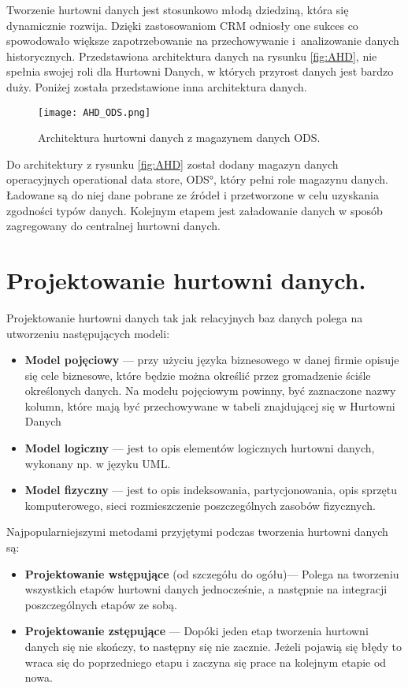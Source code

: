  
Tworzenie hurtowni danych jest stosunkowo młodą dziedziną, która się dynamicznie rozwija.
Dzięki zastosowaniom CRM odniosły one sukces co spowodowało większe zapotrzebowanie na przechowywanie
 i~analizowanie danych historycznych. Przedstawiona architektura danych na rysunku \ref{fig:AHD}, 
 nie spełnia swojej roli dla Hurtowni Danych, w których przyrost  danych jest bardzo duży.
Poniżej została przedstawione inna architektura danych.
\begin{center}
\begin{figure}[H]
  \begin{center}
    \texttt{[image: AHD\_ODS.png]}
  \end{center}
  \caption{Architektura hurtowni danych z magazynem danych ODS. }
    \label{fig:ODS}
\end{figure}
\end{center}

Do architektury z rysunku \ref{fig:AHD} został dodany magazyn danych operacyjnych \ang{operational data store, ODS}, który
pełni role magazynu danych. Ładowane są do niej dane pobrane ze źródeł i przetworzone w celu uzyskania zgodności typów danych.
Kolejnym etapem jest załadowanie danych w sposób zagregowany do centralnej hurtowni danych.


\section{Projektowanie hurtowni danych.}
Projektowanie hurtowni danych tak jak relacyjnych baz danych polega na utworzeniu następujących modeli:

\begin{itemize}
 \item \textbf{Model pojęciowy} --- 
    przy użyciu języka biznesowego w danej firmie opisuje się cele biznesowe, 
    które będzie można określić przez gromadzenie ściśle określonych danych.
   Na modelu pojęciowym powinny, być zaznaczone nazwy kolumn, które mają być przechowywane 
    w tabeli znajdującej się w Hurtowni Danych
 \item \textbf{Model logiczny} --- 
    jest to opis elementów  logicznych hurtowni danych, wykonany np. w języku UML.
 \item \textbf{Model fizyczny} --- 
    jest to opis indeksowania, partycjonowania, opis sprzętu komputerowego, sieci
     rozmieszczenie poszczególnych zasobów fizycznych.
\end{itemize}

Najpopularniejszymi metodami przyjętymi podczas tworzenia hurtowni danych są:
\begin{itemize}
 \item \textbf{Projektowanie wstępujące} (od szczegółu do ogółu)---
    Polega na tworzeniu wszystkich etapów hurtowni danych
    jednocześnie, a następnie na integracji poszczególnych etapów ze sobą.
 \item \textbf{Projektowanie zstępujące} ---
    Dopóki jeden etap tworzenia hurtowni danych się nie skończy, 
     to następny się nie zacznie.
    Jeżeli pojawią się błędy to wraca się do poprzedniego etapu i zaczyna się prace 
     na kolejnym etapie od nowa.
\end{itemize}



